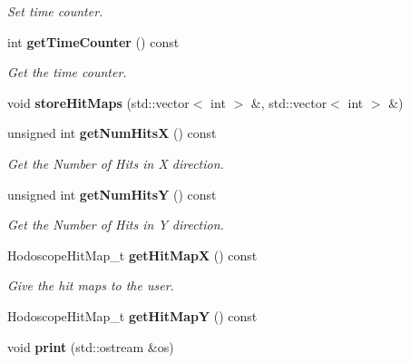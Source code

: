 \begin{DoxyCompactItemize}
\begin{DoxyCompactList}\small\item\em Set time counter. \end{DoxyCompactList}\item 
int {\bf get\-Time\-Counter} () const \label{classCALICE_1_1HodoscopeEventDataBlock_a50fb6763875658f8b91a186ec470a2da}

\begin{DoxyCompactList}\small\item\em Get the time counter. \end{DoxyCompactList}\item 
void {\bfseries store\-Hit\-Maps} (std\-::vector$<$ int $>$ \&, std\-::vector$<$ int $>$ \&)\label{classCALICE_1_1HodoscopeEventDataBlock_af6847f3dc217a31f37d5e0a3be862248}

\item 
unsigned int {\bf get\-Num\-Hits\-X} () const \label{classCALICE_1_1HodoscopeEventDataBlock_a854a79d6e112dc7153809afbcb71e40c}

\begin{DoxyCompactList}\small\item\em Get the Number of Hits in X direction. \end{DoxyCompactList}\item 
unsigned int {\bf get\-Num\-Hits\-Y} () const \label{classCALICE_1_1HodoscopeEventDataBlock_ae70c4a92cef77cc73726cd40ead186d3}

\begin{DoxyCompactList}\small\item\em Get the Number of Hits in Y direction. \end{DoxyCompactList}\item 
Hodoscope\-Hit\-Map\-\_\-t {\bf get\-Hit\-Map\-X} () const \label{classCALICE_1_1HodoscopeEventDataBlock_a56ff52ae20c90600f4268e2a9ec11015}

\begin{DoxyCompactList}\small\item\em Give the hit maps to the user. \end{DoxyCompactList}\item 
Hodoscope\-Hit\-Map\-\_\-t {\bfseries get\-Hit\-Map\-Y} () const \label{classCALICE_1_1HodoscopeEventDataBlock_a536eb4acf8bebaa40022d7cc874779ee}

\item 
void {\bf print} (std\-::ostream \&os)\label{classCALICE_1_1HodoscopeEventDataBlock_aaeb17542763207334de0346c9c02f8c8}


\end{DoxyCompactItemize}
